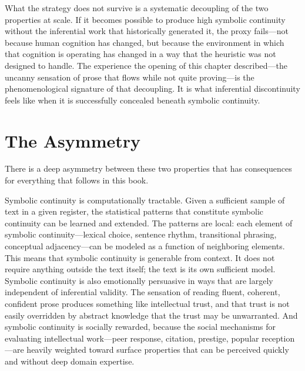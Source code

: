\documentclass[12pt, openright, twoside]{book}
\begin{document}
What the strategy does not survive is a systematic decoupling of the two properties
at scale. If it becomes possible to produce high symbolic continuity without the
inferential work that historically generated it, the proxy fails---not because
human cognition has changed, but because the environment in which that cognition
is operating has changed in a way that the heuristic was not designed to handle.
The experience the opening of this chapter described---the uncanny sensation of
prose that flows while not quite proving---is the phenomenological signature of
that decoupling. It is what inferential discontinuity feels like when it is
successfully concealed beneath symbolic continuity.

\section{The Asymmetry}

There is a deep asymmetry between these two properties that has consequences for
everything that follows in this book.

Symbolic continuity is computationally tractable. Given a sufficient sample of
text in a given register, the statistical patterns that constitute symbolic
continuity can be learned and extended. The patterns are local: each element of
symbolic continuity---lexical choice, sentence rhythm, transitional phrasing,
conceptual adjacency---can be modeled as a function of neighboring elements.
This means that symbolic continuity is generable from context. It does not require
anything outside the text itself; the text is its own sufficient model. Symbolic
continuity is also emotionally persuasive in ways that are largely independent
of inferential validity. The sensation of reading fluent, coherent, confident
prose produces something like intellectual trust, and that trust is not easily
overridden by abstract knowledge that the trust may be unwarranted. And symbolic
continuity is socially rewarded, because the social mechanisms for evaluating
intellectual work---peer response, citation, prestige, popular reception---are
heavily weighted toward surface properties that can be perceived quickly and
without deep domain expertise.
\end{document}
